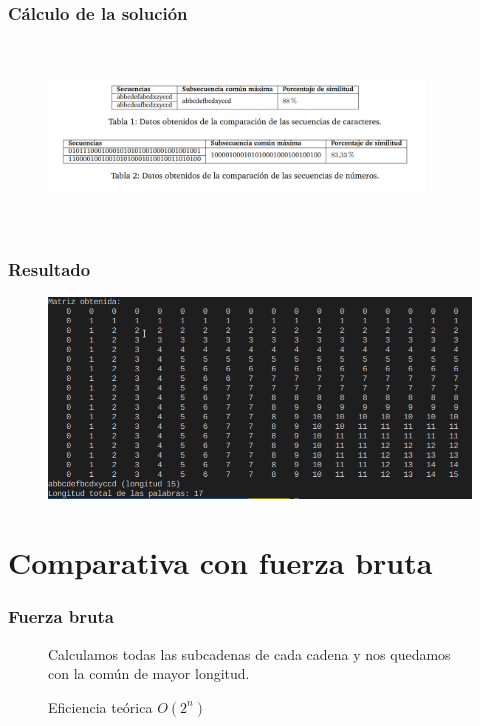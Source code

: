 \documentclass[13pt]{beamer}
\begin{document}
    \begin{frame}
		\frametitle{Cálculo de la solución}
        \begin{figure}
            \centering
            \includegraphics[width=10cm, height=5cm]{table.png}
          \end{figure}
	\end{frame}


    \begin{frame}
		\frametitle{Resultado}
        \begin{figure}
            \centering
            \includegraphics[scale=0.55]{LettersMatrixResult.png}
          \end{figure}
	\end{frame}
	
	\section{Comparativa con fuerza bruta}
	
	\begin{frame}
		\frametitle{Fuerza bruta}
		\begin{figure}
			Calculamos todas las subcadenas de cada cadena y nos quedamos con la
			común de mayor longitud.
			
			\begin{block}{Eficiencia teórica}
				\centering
				$O(2^{n})$
			\end{block}
			
		\end{figure}
	\end{frame}
\end{document}
